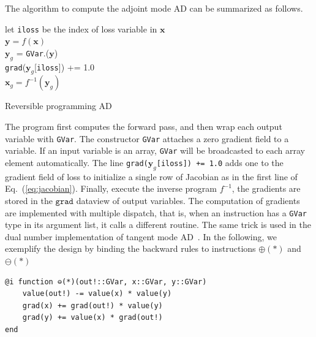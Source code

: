 \documentclass[aps,twocolumn,longbibliography,english,superscriptaddress]{revtex4-1}
\newcommand{\<}{\langle}
\renewcommand{\>}{\rangle}
\newcommand{\vx}{{\mathbf{x}}}
\newcommand{\vy}{{\mathbf{y}}}
\newcommand{\vvalue}{{\texttt{value}}}
\newcommand{\grad}{{\texttt{grad}}}
\newcommand{\Eq}[1]{Eq.~(\ref{#1})}
\theoremstyle{definition}\newtheorem{definition}{\textit{Definition}}
\begin{document}
The algorithm to compute the adjoint mode AD can be summarized as follows.

\begin{algorithm}[H]
    \KwResult{\grad.($\vx_g$)}
    let \texttt{iloss} be the index of loss variable in $\vx$\\
    $\vy = f(\vx)$\\
    $\vy_g$ = \texttt{GVar}.($\vy$)\\
    \grad($\vy_g$[\texttt{iloss}]) += 1.0\\
    $\vx_g= f^{-1}(\vy_g)$
    \caption{Reversible programming AD}\label{alg:ad}
\end{algorithm}

The program first computes the forward pass, and then wrap each output variable with \texttt{GVar}.
The constructor \texttt{GVar} attaches a zero gradient field to a variable. If an input variable is an array, \texttt{GVar} will be broadcasted to each array element automatically.
The line \texttt{\grad($\vy_g$[\texttt{iloss}]) += 1.0} adds one to the gradient field of loss to initialize a single row of Jacobian as in the first line of \Eq{eq:jacobian}.
Finally, execute the inverse program \texttt{$f^{-1}$}, the gradients are stored in the $\grad$ dataview of output variables.
The computation of gradients are implemented with multiple dispatch, that is, when an instruction has a \texttt{GVar} type in its argument list, it calls a different routine. The same trick is used in the dual number implementation of tangent mode AD~\cite{Revels2016}.
In the following, we exemplify the design by binding the backward rules to instructions \texttt{$\oplus(*)$} and \texttt{$\ominus(*)$}

\begin{minipage}{.44\textwidth}
\begin{lstlisting}[mathescape=true]
@i function ⊖(*)(out!::GVar, x::GVar, y::GVar)
    value(out!) -= value(x) * value(y)
    grad(x) += grad(out!) * value(y)
    grad(y) += value(x) * grad(out!)
end
\end{lstlisting}
\end{minipage}
\end{document}
